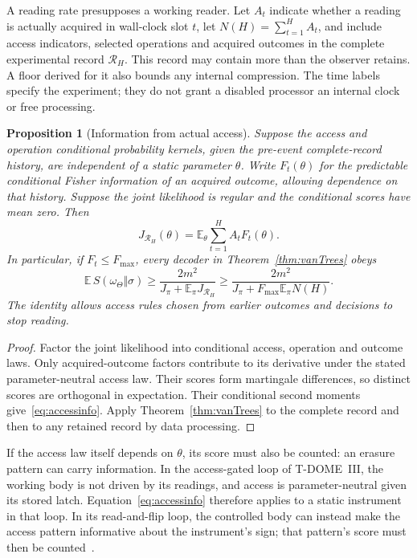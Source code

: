 \documentclass[12pt]{article}
\newtheorem{proposition}[theorem]{Proposition}
\theoremstyle{definition}
\theoremstyle{remark}
\newcommand{\E}{\mathbb E}
\begin{document}
A reading rate presupposes a working reader. Let $A_t$ indicate whether a reading is actually acquired in wall-clock slot $t$, let $N(H)=\sum_{t=1}^H A_t$, and include access indicators, selected operations and acquired outcomes in the complete experimental record $\mathcal R_H$. This record may contain more than the observer retains. A floor derived for it also bounds any internal compression. The time labels specify the experiment; they do not grant a disabled processor an internal clock or free processing.

\begin{proposition}[Information from actual access]\label{prop:accessinfo}
Suppose the access and operation conditional probability kernels, given the pre-event complete-record history, are independent of a static parameter $\theta$. Write $F_t(\theta)$ for the predictable conditional Fisher information of an acquired outcome, allowing dependence on that history. Suppose the joint likelihood is regular and the conditional scores have mean zero. Then
\begin{equation}\label{eq:accessinfo}
J_{\mathcal R_H}(\theta)=\E_\theta\sum_{t=1}^H A_tF_t(\theta).
\end{equation}
In particular, if $F_t\le F_{\max}$, every decoder in Theorem~\ref{thm:vanTrees} obeys
\begin{equation}\label{eq:accessfloor}
\E\,S(\omega_\Theta\Vert\sigma)\ge
\frac{2m^2}{J_\pi+\E_\pi J_{\mathcal R_H}}
\ge\frac{2m^2}{J_\pi+F_{\max}\E_\pi N(H)}.
\end{equation}
The identity allows access rules chosen from earlier outcomes and decisions to stop reading.
\end{proposition}

\begin{proof}
Factor the joint likelihood into conditional access, operation and outcome laws. Only acquired-outcome factors contribute to its derivative under the stated parameter-neutral access law. Their scores form martingale differences, so distinct scores are orthogonal in expectation. Their conditional second moments give~\eqref{eq:accessinfo}. Apply Theorem~\ref{thm:vanTrees} to the complete record and then to any retained record by data processing.
\end{proof}

If the access law itself depends on $\theta$, its score must also be counted: an erasure pattern can carry information. In the access-gated loop of T-DOME~III, the working body is not driven by its readings, and access is parameter-neutral given its stored latch. Equation~\eqref{eq:accessinfo} therefore applies to a static instrument in that loop. In its read-and-flip loop, the controlled body can instead make the access pattern informative about the instrument's sign; that pattern's score must then be counted~\cite{TDOMEIII}.
\end{document}
